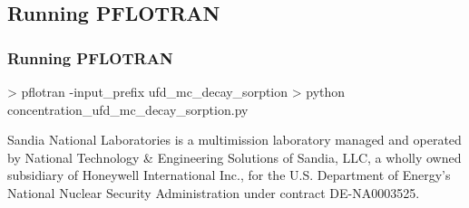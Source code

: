 \documentclass{beamer}
\begin{document}
\subsection{Running PFLOTRAN}

\begin{frame}[fragile]\frametitle{Running PFLOTRAN}
	
	\begin{semiverbatim}
		
		
		> pflotran -input_prefix ufd_mc_decay_sorption
		> python concentration_ufd_mc_decay_sorption.py
		
	\end{semiverbatim}
	
\end{frame}

\begin{frame}[fragile]
        
                Sandia National Laboratories is a multimission laboratory managed and operated by National Technology \& Engineering Solutions of Sandia, LLC, a wholly owned subsidiary of Honeywell International Inc., for the U.S. Department of Energy’s National Nuclear Security Administration under contract DE-NA0003525.

\end{frame}
\end{document}

